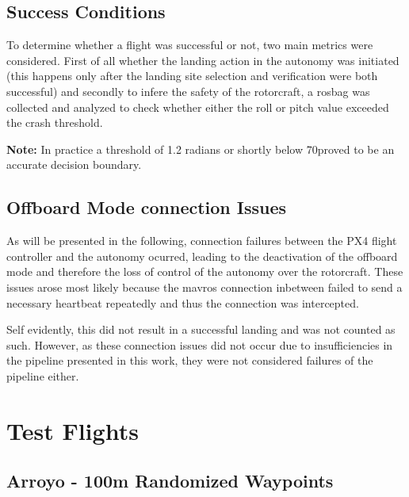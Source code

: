 \subsection{Success Conditions}
To determine whether a flight was successful or not, two main metrics were considered. First of all whether the landing action in the autonomy was initiated (this happens only after the landing site selection and verification were both successful) and secondly to infere the safety of the rotorcraft, a rosbag was collected and analyzed to check whether either the roll or pitch value exceeded the crash threshold.

\textbf{Note: } In practice a threshold of 1.2 radians or shortly below 70\degree proved to be an accurate decision boundary.

\subsection{Offboard Mode connection Issues}
As will be presented in the following, connection failures between the PX4 flight controller and the autonomy ocurred, leading to the deactivation of the offboard mode and therefore the loss of control of the autonomy over the rotorcraft. These issues arose most likely because the mavros connection inbetween failed to send a necessary heartbeat repeatedly and thus the connection was intercepted.

Self evidently, this did not result in a successful landing and was not counted as such. However, as these connection issues did not occur due to insufficiencies in the pipeline presented in this work, they were not considered failures of the pipeline either.
\clearpage
\section{Test Flights}
\subsection{Arroyo - 100m Randomized Waypoints}






